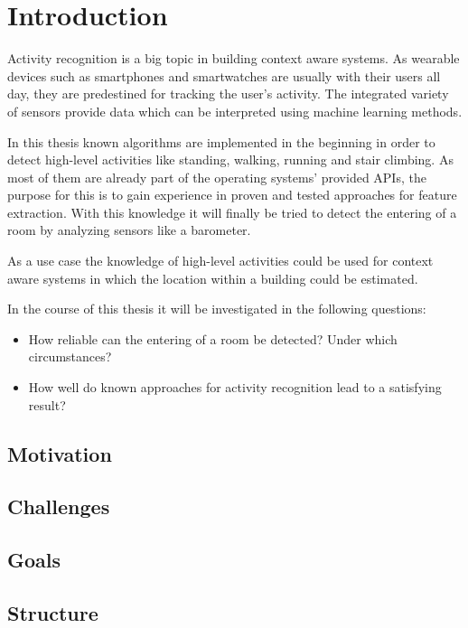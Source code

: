 \chapter{Introduction}
\label{cha:Introduction}

Activity recognition is a big topic in building context aware systems. As wearable devices such as smartphones and smartwatches are usually with their users all day, they are predestined for tracking the user's activity. The integrated variety of sensors provide data which can be interpreted using machine learning methods. 

In this thesis known algorithms are implemented in the beginning in order to detect high-level activities like standing, walking, running and stair climbing. As most of them are already part of the operating systems' provided APIs, the purpose for this is to gain experience in proven and tested approaches for feature extraction. With this knowledge it will finally be tried to detect the entering of a room by analyzing sensors like a barometer. 

As a use case the knowledge of high-level activities could be used for context aware systems in which the location within a building could be estimated. 

In the course of this thesis it will be investigated in the following questions:
\begin{itemize}
	\item How reliable can the entering of a room be detected? Under which circumstances?
	\item How well do known approaches for activity recognition lead to a satisfying result?
\end{itemize}

\section{Motivation}

\section{Challenges}

\section{Goals}

\section{Structure}